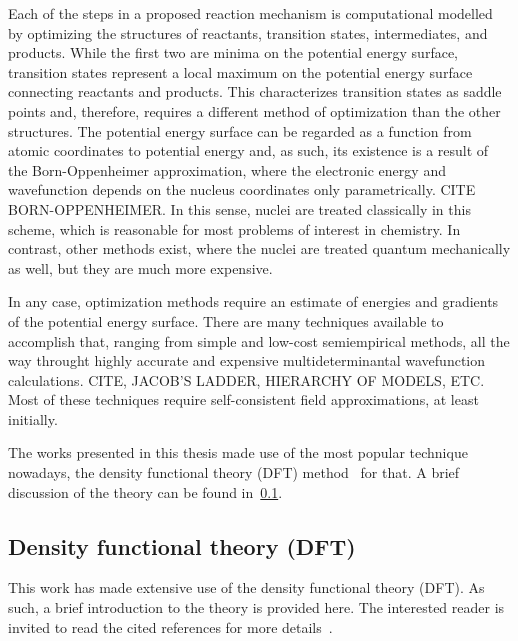 Each of the steps in a proposed reaction mechanism is computational modelled
by optimizing the structures of reactants,
transition states,
intermediates,
and products.
While the first two are minima on the potential energy surface,
transition
states represent a local maximum on the potential energy surface connecting
reactants and products.
This characterizes transition states as saddle points and,
therefore,
requires
a different method of optimization than the other structures.
The potential energy surface can be regarded as a function from atomic coordinates to potential energy and,
as such,
its existence is a result of the Born-Oppenheimer approximation,
where the electronic energy and wavefunction depends on the nucleus coordinates
only parametrically.
CITE BORN-OPPENHEIMER.\@
In this sense,
nuclei are treated classically in this scheme,
which is reasonable for most problems of interest in chemistry.
In contrast,
other methods exist,
where the nuclei are treated quantum mechanically as well,
but they are much more expensive.

In any case,
optimization methods require an estimate of energies and gradients
of the potential energy surface.
There are many techniques available to accomplish that,
ranging from simple and low-cost semiempirical methods,
all the way throught highly accurate and expensive multideterminantal wavefunction calculations.
CITE,
JACOB'S LADDER,
HIERARCHY OF MODELS,
ETC.\@
Most of these techniques require self-consistent field approximations,
at least initially.

The works presented in this thesis made use of the most popular technique nowadays,
the density functional theory (DFT)
method~\cite{Hohenberg_1964,Kohn_1965,Perdew_2014,Kryachko_2014,Yu_2016} for
that.
A brief discussion of the theory can be found in~\cref{sec:dft}.

\subsection{Density functional theory (DFT)}%
\label{sec:dft}

This work has made extensive use of the density functional theory (DFT).
As such,
a brief introduction to the theory is provided here.
The interested reader is invited to read the cited references for more
details~\cite{Hohenberg_1964,Kohn_1965}.

